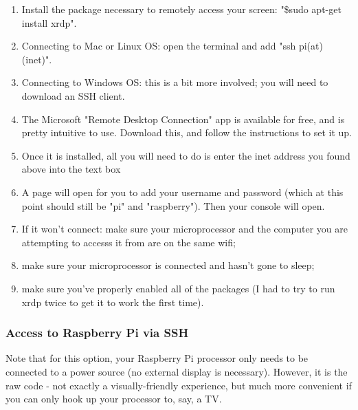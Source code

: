 \documentclass{article}\usepackage[]{graphicx}\usepackage[]{color}
\begin{document}
\begin{enumerate}

\item Install the package necessary to remotely access your screen: "\$sudo apt-get install xrdp".
\item Connecting to Mac or Linux OS: open the terminal and add "ssh pi(at) (inet)".
\item Connecting to Windows OS: this is a bit more involved; you will need to download an SSH client.  
\item The Microsoft "Remote Desktop Connection" app is available for free, and is pretty intuitive to use.  Download this, and follow the instructions to set it up.  
\item Once it is installed, all you will need to do is enter the inet address you found above into the text box
\item A page will open for you to add your username and password (which at this point should still be "pi" and "raspberry").  Then your console will open.
\item If it won't connect: make sure your microprocessor and the computer you are attempting to accesss it from are on the same wifi;
\item make sure your microprocessor is connected and hasn't gone to sleep; 
\item make sure you've properly enabled all of the packages (I had to try to run xrdp twice to get it to work the first time).  

\end{enumerate}

\subsubsection{Access to Raspberry Pi via SSH}

Note that for this option, your Raspberry Pi processor only needs to be connected to a power source (no external display is necessary).  However, it is the raw code - not exactly a visually-friendly experience, but much more convenient if you can only hook up your processor to, say, a TV.
\end{document}
